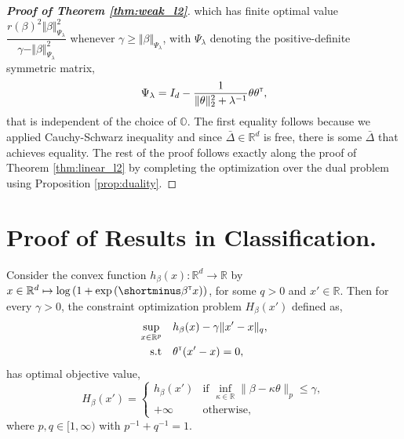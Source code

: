 \documentclass[12pt]{article}
\begin{document}
\begin{proof}[\textbf{Proof of Theorem \ref{thm:weak_l2}}]
    which has finite optimal value $\dfrac{r(\beta)^2\Vert \beta\Vert_{\Psi_\lambda}^2}{\gamma - \Vert \beta \Vert_{\Psi_\lambda}^2}$ whenever $\gamma \geq \Vert \beta \Vert_{\Psi_\lambda}$, with $\Psi_\lambda$ denoting the positive-definite symmetric matrix, \[
    \Psi_\lambda = I_d - \dfrac{1}{ \Vert \theta\Vert_2^2 + \lambda^{-1}}\theta \theta^{\scriptscriptstyle \sf T},
    \]that is independent of the choice of $\mathbb{O}$. The first equality follows because we applied Cauchy-Schwarz inequality and since $\bar{\Delta}\in\mathbb{R}^d$ is free, there is some $\bar{\Delta}$ that achieves equality. The rest of the proof follows exactly along the proof of Theorem \ref{thm:linear_l2} by completing the optimization over the dual problem using Proposition \ref{prop:duality}.
\end{proof}

\section{Proof of Results in Classification.}
\begin{lemma}
\label{lem:3}
    Consider the convex function $h_\beta(x):\mathbb{R}^d\to\mathbb{R}$ by $x\in\mathbb{R}^d \mapsto \log{(1+\exp{(\shortminus\beta\trans x)})}$, for some $q>0$ and $x'\in \mathbb{R}$. Then for every $\gamma > 0$, the constraint optimization problem $H_\beta(x')$ defined as,
    \begin{align*}
        \sup_{x\in\mathbb{R}^p} \quad &h_\beta(x) - \gamma \lVert x'-x\rVert_q,\\
        \rm s.t \quad &\theta^{\scriptscriptstyle \sf T} (x'-x) = 0,
    \end{align*}
    has optimal objective value, \[
    H_\beta(x') = \begin{cases}
        h_\beta(x') & \text{if } \inf_{\kappa\in\mathbb{R}} \lVert \beta - \kappa \theta\rVert_p \leq \gamma,\\
        +\infty & \text{otherwise,}
    \end{cases}
    \]where $p,q\in[1,\infty)$ with $p^{-1} + q^{-1} = 1$.
\end{lemma}
\end{document}
